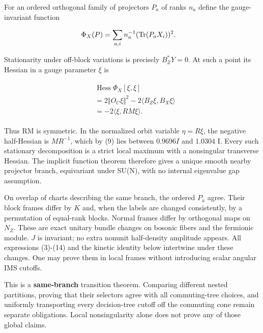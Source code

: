 For an ordered orthogonal family of projectors \(P_{a}\) of ranks
\(n_{a}\) define the gauge-invariant function

\begin{gather*}
\begin{aligned}
& \Phi _{X}(P)=\sum _{a,i} n_{a}^{-1} (\operatorname{Tr} (P_{a} X_{i}))^{2}.
\end{aligned}\notag
\end{gather*}

Stationarity under off-block variations is precisely \(B_{Z}^{*}Y=0\).
At such a point its Hessian in a gauge parameter \(\xi\) is

\begin{gather*}
\begin{aligned}
& \operatorname{Hess}  \Phi _{X}[\xi ,\xi ] \\
& =2\Vert O_{C} \xi \Vert ^{2}-2\langle B_{Z} \xi ,B_{X} \xi\rangle \\
& =-2\langle \xi ,R M \xi\rangle .
\end{aligned}\tag{14}
\end{gather*}

Thus RM is symmetric. In the normalized orbit variable \(\eta =R \xi\),
the negative half-Hessian is \(M R^{-1}\), which by (9) lies between
\(0.9696 I\) and \(1.0304\) I. Every such stationary decomposition is a
strict local maximum with a nonsingular transverse Hessian. The implicit
function theorem therefore gives a unique smooth nearby projector
branch, equivariant under SU(N), with no internal eigenvalue gap
assumption.

On overlap of charts describing the same branch, the ordered \(P_{a}\)
agree. Their block frames differ by \(K\) and, when the labels are
changed consistently, by a permutation of equal-rank blocks. Normal
frames differ by orthogonal maps on \(N_{Z}\). These are exact unitary
bundle changes on bosonic fibers and the fermionic module. \(J\) is
invariant; no extra nonunit half-density amplitude appears. All
expressions (3)-(14) and the kinetic identity below intertwine under
these changes. One may prove them in local frames without introducing
scalar angular IMS cutoffs.

This is a \textbf{same-branch} transition theorem. Comparing different
nested partitions, proving that their selectors agree with all
commuting-tree choices, and uniformly transporting every decision-tree
cutoff off the commuting cone remain separate obligations. Local
nonsingularity alone does not prove any of those global claims.


